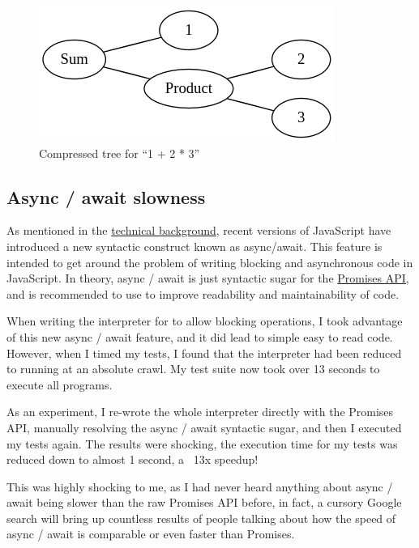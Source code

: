 \begin{figure}
    \caption{Compressed tree for ``1 + 2 * 3''}
    \label{setanta:compressedtree}
    \begin{center}
    \includegraphics[scale=0.8]{app2assets/smallgraph}
    \end{center}
\end{figure}

\subsection{Async / await slowness}
\label{solution:asyncawaitslowness}

As mentioned in the \hyperref[background:asyncawait]{technical background}, recent versions of JavaScript have introduced a new syntactic construct known as async/await. This feature is intended to get around the problem of writing blocking and asynchronous code in JavaScript. In theory, async / await is just syntactic sugar for the \hyperref[background:asyncawait]{Promises API}, and is recommended to use to improve readability and maintainability of code.

When writing the interpreter for \Setanta{} to allow blocking operations, I took advantage of this new async / await feature, and it did lead to simple easy to read code. However, when I timed my tests, I found that the interpreter had been reduced to running at an absolute crawl. My test suite now took over 13 seconds to execute all programs.

As an experiment, I re-wrote the whole interpreter directly with the Promises API, manually resolving the async / await syntactic sugar, and then I executed my tests again. The results were shocking, the execution time for my tests was reduced down to almost 1 second, a ~13x speedup!

This was highly shocking to me, as I had never heard anything about async / await being slower than the raw Promises API before, in fact, a cursory Google search will bring up countless results of people talking about how the speed of async / await is comparable or even faster than Promises.

